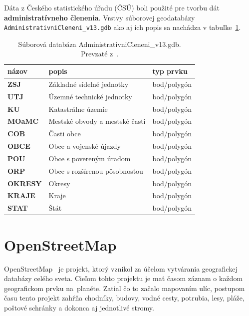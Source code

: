 Dáta z Českého statistického úřadu (ČSÚ) boli použité pre tvorbu dát \textbf{administratívneho členenia}. Vrstvy súborovej geodatabázy \texttt{AdministrativniCleneni\_v13.gdb} ako aj ich popis sa nachádza v tabuľke~\ref{tab:administrativne-clenenie}.
\begin{table}[H]
\caption{Súborová databáza AdministrativniCleneni\_v13.gdb. Prevzaté z~\cite{arcgis}.}
\label{tab:administrativne-clenenie}
\centering
\begin{tabular}{|lll|}
    \hline
    \textbf{názov}  & \textbf{popis}                 & \textbf{typ prvku} \\ \hline
    \textbf{ZSJ}    & Základné sídelné jednotky      & bod/polygón        \\
    \textbf{UTJ}    & Územné technické jednotky      & bod/polygón        \\
    \textbf{KU}     & Katastrálne územie             & bod/polygón        \\
    \textbf{MOaMC}  & Mestské obvody a mestské časti & bod/polygón        \\
    \textbf{COB}    & Časti obce                     & bod/polygón        \\
    \textbf{OBCE}   & Obce a vojenské újazdy         & bod/polygón        \\
    \textbf{POU}    & Obce s povereným úradom        & bod/polygón        \\
    \textbf{ORP}    & Obce s rozšírenou pôsobnosťou  & bod/polygón        \\
    \textbf{OKRESY} & Okresy                         & bod/polygón        \\
    \textbf{KRAJE}  & Kraje                          & bod/polygón        \\
    \textbf{STAT}   & Štát                           & bod/polygón        \\ \hline
\end{tabular}
\end{table}


\section{OpenStreetMap}
OpenStreetMap~\cite{openstreet} je projekt, ktorý vznikol za účelom vytvárania geografickej databázy celého sveta. Cieľom tohto projektu je mať časom záznam o každom geografickom prvku na~planéte. Zatiaľ čo to začalo mapovaním ulíc, postupom času tento projekt zahŕňa chodníky, budovy, vodné cesty, potrubia, lesy, pláže, poštové schránky a dokonca aj jednotlivé stromy.

